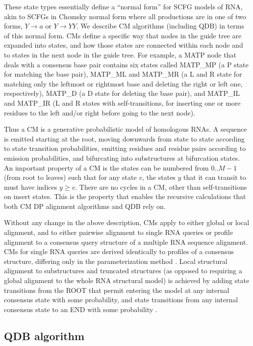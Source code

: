 \documentclass[11pt]{article}
\begin{document}
These state types essentially define a ``normal form'' for SCFG
models of RNA, akin to SCFGs in Chomsky normal form where all
productions are in one of two forms, $Y \rightarrow a$ or $Y
\rightarrow YY$. We describe CM algorithms (including QDB) in terms of
this normal form. CMs define a specific way that nodes in the guide
tree are expanded into states, and how those states are connected
within each node and to states in the next node in the guide tree. For
example, a MATP node that deals with a consensus base pair contains
six states called MATP\_MP (a P state for matching the base pair),
MATP\_ML and MATP\_MR (a L and R state for matching only the leftmost
or rightmost base and deleting the right or left one, respectively),
MATP\_D (a D state for deleting the base pair), and MATP\_IL and
MATP\_IR (L and R states with self-transitions, for inserting one or
more residues to the left and/or right before going to the next
node).

Thus a CM is a generative probabilistic model of homologous RNAs.  A
sequence is emitted starting at the root, moving downwards from state
to state according to state transition probabilities, emitting
residues and residue pairs according to emission probabilities, and
bifurcating into substructures at bifurcation states. An important
property of a CM is the states can be numbered from $0..M-1$ (from root
to leaves) such that for any state $v$, the states $y$ that it can
transit to must have indices $y \geq v$. There are no cycles in a
CM, other than self-transitions on insert states.  This is the
property that enables the recursive calculations that both CM DP
alignment algorithms and QDB rely on.

Without any change in the above description, CMs apply to either
global or local alignment, and to either pairwise alignment to single
RNA queries or profile alignment to a consensus query structure of a
multiple RNA sequence alignment. CMs for single RNA queries are
derived identically to profiles of a consensus structure, differing
only in the parameterization method \cite{KleinEddy03}. Local
structural alignment to substructures and truncated structures (as
opposed to requiring a global alignment to the whole RNA structural
model) is achieved by adding state transitions from the ROOT that
permit entering the model at any internal consensus state with some
probability, and state transitions from any internal consensus state 
to an END with some probability \cite{KleinEddy03, infguide03}.

\subsection{QDB algorithm}
\end{document}

